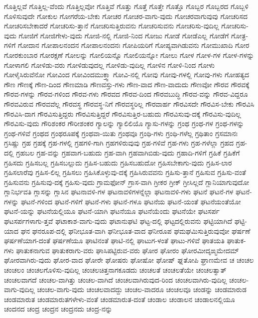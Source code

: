 {ಗೊತ್ತಿಲ್ಲವೆ
ಗೊತ್ತಿಲ್ಲ-ವೆಂದು
ಗೊತ್ತಿಲ್ಲವೋ
ಗೊತ್ತಿವೆ
ಗೊತ್ತು
ಗೊತ್ತೆ
ಗೊತ್ತೇ
ಗೊತ್ತೊ
ಗೊಬ್ಬರ
ಗೊಬ್ಬರದ
ಗೊಬ್ಬಳಿ
ಗೊಳಿಸುವುದೇ
ಗೋಕುಲ
ಗೋಗರೆಯ-ಬೇಕು
ಗೋಚರ
ಗೋಚರ-ವಾಗು-ವುದು
ಗೋಚರವಾಗುವುವು
ಗೋಚರಿಸದ
ಗೋಚರಿಸಬೇಕಾದರೆ
ಗೋಚರಿಸು-ತ್ತಾನೆ
ಗೋಚರಿಸುತ್ತಿರುವನು
ಗೋಚರಿಸುವನು
ಗೋಚರಿಸು-ವುದಿಲ್ಲ
ಗೋಚರಿಸು-ವುದು
ಗೋಜಿಗೆ
ಗೋಜಿಗೇಳು-ವುದು
ಗೋಜಿ-ನಲ್ಲಿ
ಗೋಜಿ-ನಿಂದ
ಗೋಜು
ಗೋಡೆ
ಗೋಡೆಎಲ್ಲ
ಗೋಡೆಗೆ
ಗೋತ್ರ-ಗಳಿಗೆ
ಗೋದಾನ
ಗೋಪಾಲನಂದನ
ಗೋಪಾಲನಂದನಃ
ಗೋಪಿಯರಿಗೆ
ಗೋಪ್ಯವಾಗಿಡುವನು
ಗೋಮುಖಾದಿ
ಗೋರ
ಗೋರಕುಂಬಾರ
ಗೋರಕ್ಷಣೆ
ಗೋಲನ್ನು
ಗೋಲಿಯನ್ನೊ
ಗೋಲಿಯನ್ನೋ
ಗೋಲು
ಗೋಳ
ಗೋಳ-ಗಳ
ಗೋಳ-ಗಳನ್ನು
ಗೋಳಾಗಲಿ
ಗೋಳಿಡು-ವರು
ಗೋಳಿಡುವುದಲ್ಲ
ಗೋಳಿಡು-ವುದಿಲ್ಲ
ಗೋಳಿನ
ಗೋಳಿ-ನಿಂದ
ಗೋಳು
ಗೋಳೈಸಿರುವೆನೋ
ಗೋವಿಂದ
ಗೋವಿಂದಮುಕ್ತ್ವಾ
ಗೋವಿ-ನಲ್ಲಿ
ಗೋವು
ಗೋವು-ಗಳಲ್ಲಿ
ಗೋವು-ಗಳು
ಗೋಹತ್ಯದ
ಗೌಣ
ಗೌಣಕ್ಕೆ
ಗೌಣ-ದಿಂದ
ಗೌಣಮಾಡಿ
ಗೌಣವಸ್ತು-ಗಳು
ಗೌಣ-ವಾದ
ಗೌಣ-ವಾದುದು
ಗೌಣವೋ
ಗೌರವ
ಗೌರವಕ್ಕೆ
ಗೌರವ-ಗಳನ್ನು
ಗೌರವ-ಗಳಿಂದ
ಗೌರವ-ಗಳು
ಗೌರವದ
ಗೌರವ-ದಿಂದ
ಗೌರವಬುದ್ಧಿ
ಗೌರವ-ವನ್ನು
ಗೌರವ-ವಿದ್ದರೂ
ಗೌರವವಿರುವ
ಗೌರವವೆಲ್ಲ
ಗೌರವಸ್ಥ
ಗೌರವಸ್ಥ-ನಿಗೆ
ಗೌರವಸ್ಥರಿಲ್ಲ
ಗೌರವಾರ್ಹ
ಗೌರವಿಸದೇ
ಗೌರವಿಸ-ಬೇಕು
ಗೌರವಿಸಿ
ಗೌರವಿಸಿ-ದಾಗ
ಗೌರವಿಸುತ್ತಿದ್ದರು
ಗೌರವಿಸುತ್ತಿದ್ದರೆ
ಗೌರವಿಸುತ್ತಿರ-ಬಹುದು
ಗೌರವಿಸುವು-ದಕ್ಕೆ
ಗೌರವಿಸು-ವುದಿಲ್ಲ
ಗೌರವಿಸು-ವುದು
ಗೌರಿಶಂಕರ
ಗೌರೀಶಂಕರ
ಗ್ಯಾಲನ್ನು
ಗ್ಯಾಲಿಲಿಯೊ
ಗ್ಯಾಸು-ಗಳನ್ನು
ಗ್ರಂಥ
ಗ್ರಂಥ-ಗಳ
ಗ್ರಂಥ-ಗಳನ್ನು
ಗ್ರಂಥ-ಗಳಿವೆ
ಗ್ರಂಥದ
ಗ್ರಂಥರೂಪಕ್ಕೆ
ಗ್ರಂಥವಾ-ಯಿತು
ಗ್ರಂಥವೂ
ಗ್ರಂಥಿ-ಗಳು
ಗ್ರಂಥಿ-ಗಳೆಲ್ಲ
ಗ್ರಥಿತಾಂ
ಗ್ರಸಮಾನಃ
ಗ್ರಸಿಷ್ಣು
ಗ್ರಹ
ಗ್ರಹಕ್ಕೆ
ಗ್ರಹ-ಗಳಲ್ಲಿ
ಗ್ರಹಗಳಿ-ಗಾಗಿ
ಗ್ರಹಗಳಿರುವುವು
ಗ್ರಹ-ಗಳಿವೆ
ಗ್ರಹ-ಗಳು
ಗ್ರಹ-ಗಳೆಲ್ಲಾ
ಗ್ರಹದ
ಗ್ರಹ-ದಲ್ಲಿ
ಗ್ರಹಬಲ
ಗ್ರಹ-ವನ್ನು
ಗ್ರಹವಾಗ-ಬಹುದು
ಗ್ರಹ-ವಾಗಿ
ಗ್ರಹವಾಗಿಬಿಡು-ವುದು
ಗ್ರಹಾದಿ-ಗಳಿಗೆ
ಗ್ರಹಿಕೆ
ಗ್ರಹಿಕೆಗೆ
ಗ್ರಹಿಸದು
ಗ್ರಹಿಸಬಲ್ಲ
ಗ್ರಹಿಸಬಲ್ಲುದು
ಗ್ರಹಿಸ-ಬಹುದು
ಗ್ರಹಿಸಬಹುದೋ
ಗ್ರಹಿಸಬೇಕಾಗು-ವುದು
ಗ್ರಹಿಸ-ಲಾರ
ಗ್ರಹಿಸಲಾರೆವು
ಗ್ರಹಿಸ-ಲಿಲ್ಲ
ಗ್ರಹಿಸಲು
ಗ್ರಹಿಸಿಕೊಳ್ಳುವು-ದಕ್ಕೆ
ಗ್ರಹಿಸಿರುವವನು
ಗ್ರಹಿಸು-ತ್ತಾನೆ
ಗ್ರಹಿಸುವ
ಗ್ರಹಿಸು-ವಂತೆ
ಗ್ರಹಿಸುವನು
ಗ್ರಹಿಸುವು-ದಕ್ಕೆ
ಗ್ರಹಿಸು-ವುದು
ಗ್ರಾಮಫೋನ್
ಗ್ರಾಸ-ವಾಗಿ
ಗ್ರೀಕರ
ಗ್ರೀಕ್
ಗ್ರೀಸಿಲ್ಲದೆ
ಗ್ಲಾನಿಯಾಗುವುದೋ
ಗ್ಲಾನಿರ್ಭವತಿ
ಗ್ಲಾಸನ್ನು
ಗ್ಲಾಸಿನ
ಘಟನಾವಳಿ-ಗಳ
ಘಟನಾವಳಿಗಳನ್ನೆಲ್ಲಾ
ಘಟನಾವಳಿ-ಗಳು
ಘಟನೆ
ಘಟನೆ-ಗಳ
ಘಟನೆ-ಗಳನ್ನು
ಘಟನೆ-ಗಳಿಂದ
ಘಟನೆ-ಗಳಿಗೆ
ಘಟನೆ-ಗಳು
ಘಟನೆ-ಗಳೂ
ಘಟನೆಯ
ಘಟನೆ-ಯಂತೆ
ಘಟನೆಯಂತೆಯೋ
ಘಟನೆ-ಯನ್ನು
ಘಟನೆಯಲ್ಲಿಯೂ
ಘಟನೆ-ಯಾಗಿ
ಘಟನೆಯೂ
ಘಟನೆಯೆಂದು
ಘಟನೆಯೇ
ಘಟಸರ್ಪ
ಘಟಸರ್ಪಗಳಾಗು-ತ್ತವೆ
ಘಟಾಕಾಶ-ವಾಗು-ವುದು
ಘಟಾನುಘಟಿ
ಘಟ್ಟ-ದಲ್ಲಿ
ಘಟ್ಟದಲ್ಲಿರುವನು
ಘಟ್ಟಿಯಾಗಿದೆ
ಘಟ್ಟಿ-ಯಾದ
ಘನ
ಘನರೂಪ-ದಲ್ಲಿ
ಘನೀಭೂತ-ವಾಗಿ
ಘನೀಭೂತ-ವಾದ
ಘನೀರೂಪ
ಘಮಘಮಿಸುತ್ತಿರುವುವೋ
ಘರ್ಷಣೆ
ಘರ್ಷಣೆಯಾಗ-ದಂತೆ
ಘರ್ಷಣೆಯೂ
ಘಾಟಿನಂತೆ
ಘಾಟಿ-ನಲ್ಲಿ
ಘಾಟುಗ-ಳಂತೆ
ಘಾಟು-ಗಳಿವೆ
ಘಾತಯತಿ
ಘಾತುಕ-ಗಳು
ಘಾತುಕನಾಗುವ
ಘಾತುಕರಾಗು-ವರು
ಘಾಸಿಪಟ್ಟಿರುವ-ವರು
ಘೋರ
ಘೋರಂ
ಘೋರಮೀದೃಙ್ಮಮೇದಮ್
ಘೋರವಾಗಿರು-ವುದು
ಘೋರ-ವಾದ
ಘೋರೇ
ಘೋಷರು
ಘೋಷೋ
ಘೋಷ್
ಘ್ನತೋಪಿ
ಘ್ರಾಣಮೇವ
ಚ
ಚಂಚಲ
ಚಂಚಲಂ
ಚಂಚಲಗೊಳಿಸು-ವುದಿಲ್ಲ
ಚಂಚಲಚಿತ್ತನಾಗಕೂಡದು
ಚಂಚಲತೆ
ಚಂಚಲತೆಯೇ
ಚಂಚಲತ್ವಾತ್
ಚಂಚಲವಾಗದೆ
ಚಂಚಲ-ವಾಗಿತ್ತು
ಚಂಚಲ-ವಾಗಿದೆ
ಚಂಚಲವಾಗಿರುವುದ-ರಿಂದ
ಚಂಚಲವಾಗಿರು-ವುದಿಲ್ಲ
ಚಂಚಲ-ವಾಗು-ವುದಿಲ್ಲ
ಚಂಚಲ-ವಾಗು-ವುದು
ಚಂಚಲವಾದದ್ದು
ಚಂಚಲ-ವಾದರೂ
ಚಂಚಲವೂ
ಚಂಡನ್ನು
ಚಂಡಮಾರುಡ
ಚಂಡಮಾರುತ
ಚಂಡಮಾರುತಗಳೇಳು-ವಂತೆ
ಚಂಡಮಾರುತ-ದಂತೆ
ಚಂಡಾಲ
ಚಂಡಾಲನ
ಚಂಡಾಲನಲ್ಲಿಯೂ
ಚಂದನದ
ಚಂದ್ರ
ಚಂದ್ರನ
ಚಂದ್ರನದು
ಚಂದ್ರ-ನನ್ನು
}
